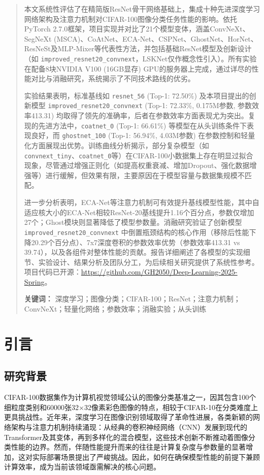 \documentclass[a4paper]{article}
\begin{document}
\clearpage
\begin{abstract}
\indent 本文系统性评估了在精简版ResNet骨干网络基础上，集成十种先进深度学习网络架构及注意力机制对CIFAR-100图像分类任务性能的影响。依托PyTorch 2.7.0框架，项目实现并对比了21个模型变体，涵盖ConvNeXt、SegNeXt (MSCA)、CoAtNet、ECA-Net、CSPNet、GhostNet、HorNet、ResNeSt及MLP-Mixer等代表性方法，并包括基础ResNet模型及创新设计（如 \texttt{improved\_resnet20\_convnext}，LSKNet仅作概念性引入）。所有实验在配备8块NVIDIA V100 (16GB显存) GPU的服务器上完成，通过详尽的性能对比与消融研究，系统揭示了不同技术路线的优劣。

\indent 实验结果表明，标准基线如 \texttt{resnet\_56} (Top-1: 72.50\%) 及本项目提出的创新模型 \texttt{improved\_resnet20\_convnext} (Top-1: 72.33\%, 0.175M参数, 参数效率413.31) 均取得了领先的准确率，后者在参数效率方面表现尤为突出。复现的先进方法中，\texttt{coatnet\_0} (Top-1: 66.61\%) 等模型在从头训练条件下表现良好，而 \texttt{ghostnet\_100} (Top-1: 56.94\%, 4.03M参数) 在参数控制和轻量化方面展现出优势。训练曲线分析揭示，部分复杂模型（如\texttt{convnext\_tiny}、\texttt{coatnet\_0}等）在CIFAR-100小数据集上存在明显过拟合现象，尽管通过增强正则化（如提高权重衰减、增加Dropout、强化数据增强等）进行缓解，但效果有限，主要原因在于模型容量与数据集规模不匹配。

\indent 进一步分析表明，ECA-Net等注意力机制可有效提升基线模型性能，其中自适应核大小的ECA-Net相较ResNet-20基线提升1.16个百分点，参数仅增加27个；Ghost模块则显著降低了模型参数量。消融研究验证了创新模型 \texttt{improved\_resnet20\_convnext} 中倒置瓶颈结构的核心作用（移除后性能下降20.29个百分点）、7x7深度卷积的参数效率优势（参数效率413.31 vs 39.74），以及各组件对整体性能的贡献。报告详细阐述了各模型的实现细节、实验设计、结果分析及团队分工，为后续相关研究提供了系统性参考。项目代码已开源：\url{https://github.com/GH2050/Deep-Learning-2025-Spring}。

\vspace{0.5cm}
\noindent \textbf{关键词：} 深度学习；图像分类；CIFAR-100；ResNet；注意力机制；ConvNeXt；轻量化网络；参数效率；消融实验；从头训练
\end{abstract}
\clearpage

\tableofcontents
\newpage

\section{引言}
\subsection{研究背景}
CIFAR-100数据集作为计算机视觉领域公认的图像分类基准之一，因其包含100个细粒度类别和60000张32×32像素彩色图像的特点，相较于CIFAR-10在分类难度上更具挑战性。近年来，深度学习在图像识别领域取得了革命性进展，各类新颖的网络架构与注意力机制持续涌现：从经典的卷积神经网络（CNN）发展到现代的Transformer及其变体，再到多样化的混合模型，这些技术创新不断推动着图像分类性能的边界。然而，伴随性能提升而来的往往是计算复杂度与参数量的显著增加，这对实际部署场景提出了严峻挑战。因此，如何在确保模型性能的前提下兼顾计算效率，成为当前该领域亟需解决的核心问题。
\end{document}
